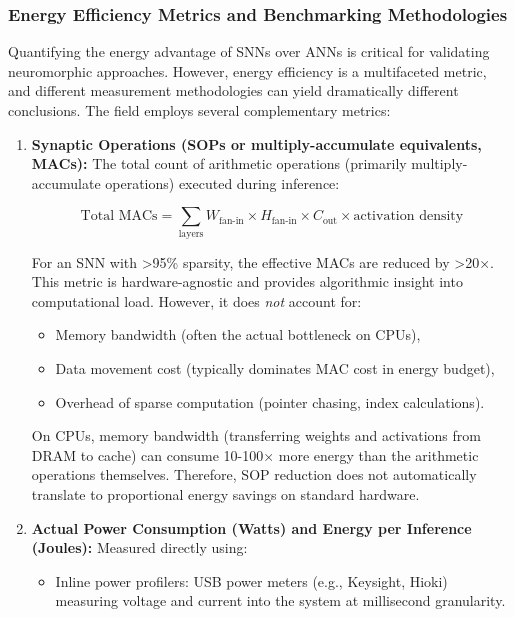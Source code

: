 \subsubsection{Energy Efficiency Metrics and Benchmarking Methodologies}

Quantifying the energy advantage of SNNs over ANNs is critical for validating neuromorphic approaches. However, 
energy efficiency is a multifaceted metric, and different measurement methodologies can yield dramatically different 
conclusions. The field employs several complementary metrics:

\begin{enumerate}
    
\item \textbf{Synaptic Operations (SOPs or multiply-accumulate equivalents, MACs):}
The total count of arithmetic operations (primarily multiply-accumulate operations) executed during inference:

$$\text{Total MACs} = \sum_{\text{layers}} W_{\text{fan-in}} \times H_{\text{fan-in}} \times C_{\text{out}} \times \text{activation density}$$

For an SNN with >95\% sparsity, the effective MACs are reduced by >20×. This metric is hardware-agnostic and 
provides algorithmic insight into computational load. However, it does \emph{not} account for:
    \begin{itemize}
        \item Memory bandwidth (often the actual bottleneck on CPUs),
        \item Data movement cost (typically dominates MAC cost in energy budget),
        \item Overhead of sparse computation (pointer chasing, index calculations).
    \end{itemize}

On CPUs, memory bandwidth (transferring weights and activations from DRAM to cache) can consume 10-100× more 
energy than the arithmetic operations themselves. Therefore, SOP reduction does not automatically translate to 
proportional energy savings on standard hardware.

    
\item \textbf{Actual Power Consumption (Watts) and Energy per Inference (Joules):}
Measured directly using:
    \begin{itemize}
        \item Inline power profilers: USB power meters (e.g., Keysight, Hioki) measuring voltage and current into 
        the system at millisecond granularity.
        

\end{itemize}
\end{enumerate}
